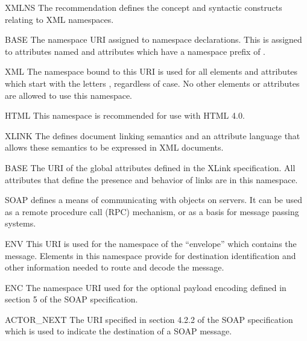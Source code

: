 \documentclass{howto}
\begin{document}
\begin{classdesc*}{XMLNS}
  The  recommendation defines the concept and syntactic constructs
  relating to XML namespaces.

  \begin{memberdesc}{BASE}
    The namespace URI assigned to namespace declarations.  This is
    assigned to attributes named  and attributes which
    have a namespace prefix of .
  \end{memberdesc}

  \begin{memberdesc}{XML}
    The namespace bound to this URI is used for all elements and
    attributes which start with the letters , regardless of
    case.  No other elements or attributes are allowed to use this
    namespace.
  \end{memberdesc}

  \begin{memberdesc}{HTML}
    This namespace is recommended for use with HTML 4.0.
  \end{memberdesc}
\end{classdesc*}


\begin{classdesc*}{XLINK}
  The 
  defines document linking semantics and an attribute language that
  allows these semantics to be expressed in XML documents.

  \begin{memberdesc}{BASE}
    The URI of the global attributes defined in the XLink
    specification.  All attributes that define the presence and
    behavior of links are in this namespace.
  \end{memberdesc}
\end{classdesc*}


\begin{classdesc*}{SOAP}
  defines a means of communicating with objects on servers. It can be
  used as a remote procedure call (RPC) mechanism, or as a basis for
  message passing systems.

  \begin{memberdesc}{ENV}
    This URI is used for the namespace of the ``envelope'' which
    contains the message.  Elements in this namespace provide for
    destination identification and other information needed to route
    and decode the message.
  \end{memberdesc}

  \begin{memberdesc}{ENC}
    The namespace URI used for the optional payload encoding defined
    in section 5 of the SOAP specification.
  \end{memberdesc}

  \begin{memberdesc}{ACTOR_NEXT}
    The URI specified in section 4.2.2 of the SOAP specification which
    is used to indicate the destination of a SOAP message.
  \end{memberdesc}
\end{classdesc*}
\end{document}
